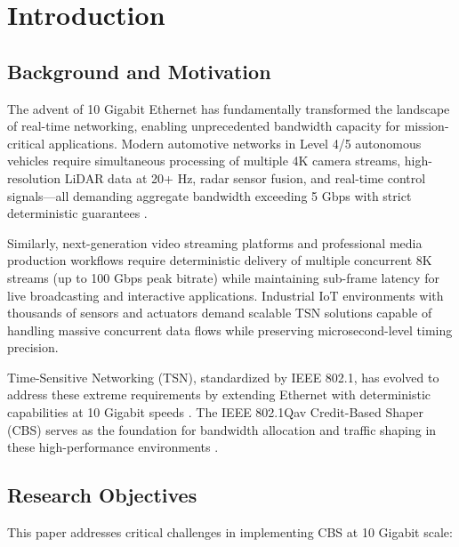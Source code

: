 \documentclass[10pt, journal, compsoc]{IEEEtran}
\begin{document}
\maketitle

\section{Introduction}
\label{sec:introduction}

\subsection{Background and Motivation}

The advent of 10 Gigabit Ethernet has fundamentally transformed the landscape of real-time networking, enabling unprecedented bandwidth capacity for mission-critical applications. Modern automotive networks in Level 4/5 autonomous vehicles require simultaneous processing of multiple 4K camera streams, high-resolution LiDAR data at 20+ Hz, radar sensor fusion, and real-time control signals—all demanding aggregate bandwidth exceeding 5 Gbps with strict deterministic guarantees \cite{automotive2024trends}.

Similarly, next-generation video streaming platforms and professional media production workflows require deterministic delivery of multiple concurrent 8K streams (up to 100 Gbps peak bitrate) while maintaining sub-frame latency for live broadcasting and interactive applications. Industrial IoT environments with thousands of sensors and actuators demand scalable TSN solutions capable of handling massive concurrent data flows while preserving microsecond-level timing precision.

Time-Sensitive Networking (TSN), standardized by IEEE 802.1, has evolved to address these extreme requirements by extending Ethernet with deterministic capabilities at 10 Gigabit speeds \cite{ieee8021tsn2024}. The IEEE 802.1Qav Credit-Based Shaper (CBS) serves as the foundation for bandwidth allocation and traffic shaping in these high-performance environments \cite{ieee8021qav2024}.

\subsection{Research Objectives}

This paper addresses critical challenges in implementing CBS at 10 Gigabit scale:
\end{document}
